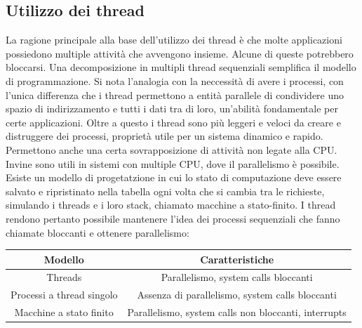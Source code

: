 \subsection{Utilizzo dei thread}
La ragione principale alla base dell'utilizzo dei thread \`e che molte applicazioni possiedono multiple attivit\`a che avvengono insieme. Alcune di queste potrebbero bloccarsi. Una
decomposizione in multipli thread sequenziali semplifica il modello di programmazione. Si nota l'analogia con la neccessit\`a di avere i processi, con l'unica differenza che i thread
permettono a entit\`a parallele di condividere uno spazio di indirizzamento e tutti i dati tra di loro, un'abilit\`a fondamentale per certe applicazioni. Oltre a questo i thread sono
pi\`u leggeri e veloci da creare e distruggere dei processi, propriet\`a utile per un sistema dinamico e rapido. Permettono anche una certa sovrapposizione di attivit\`a non legate alla
CPU. Invine sono utili in sistemi con multiple CPU, dove il parallelismo \`e possibile. Esiste un modello di progetatzione in cui lo stato di computazione deve essere salvato e
ripristinato nella tabella ogni volta che si cambia tra le richieste, simulando i threads e i loro stack, chiamato macchine a stato-finito. I thread rendono pertanto possibile mantenere
l'idea dei processi sequenziali che fanno chiamate bloccanti e ottenere parallelismo:\\
\begin{tabular}{|c|c|}
	\hline
	\textbf{Modello}          & \textbf{Caratteristiche}                             \\
	\hline
	Threads                   & Parallelismo, system calls bloccanti                 \\
	\hline
	Processi a thread singolo & Assenza di parallelismo, system calls bloccanti      \\
	\hline
	Macchine a stato finito   & Parallelismo, system calls non bloccanti, interrupts \\
	\hline
\end{tabular}
